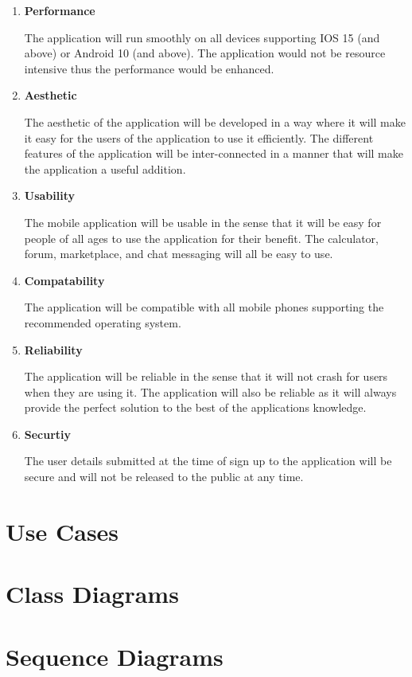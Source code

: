 \documentclass{article}
\begin{document}
\begin{enumerate}
    
    \item \textbf{Performance}
    
    The application will run smoothly on all devices supporting IOS 15 (and above) or Android 10 (and above). The application would not be resource intensive thus the performance would be enhanced. 

    \item \textbf{Aesthetic} 
    
    The aesthetic of the application will be developed in a way where it will make it easy for the users of the application to use it efficiently. The different features of the application will be inter-connected in a manner that will make the application a useful addition. 
    
    \item \textbf{Usability}
    
    The mobile application will be usable in the sense that it will be easy for people of all ages to use the application for their benefit. The calculator, forum, marketplace, and chat messaging will all be easy to use. 

    \item \textbf{Compatability}
    
    The application will be compatible with all mobile phones supporting the recommended operating system. 
    
    \item \textbf{Reliability} 
    
    The application will be reliable in the sense that it will not crash for users when they are using it. The application will also be reliable as it will always provide the perfect solution to the best of the applications knowledge. 
    
    \item \textbf{Securtiy}
    
    The user details submitted at the time of sign up to the application will be secure and will not be released to the public at any time. 

\end{enumerate}

\section*{Use Cases}



\section*{Class Diagrams}


\section*{Sequence Diagrams}
\end{document}
